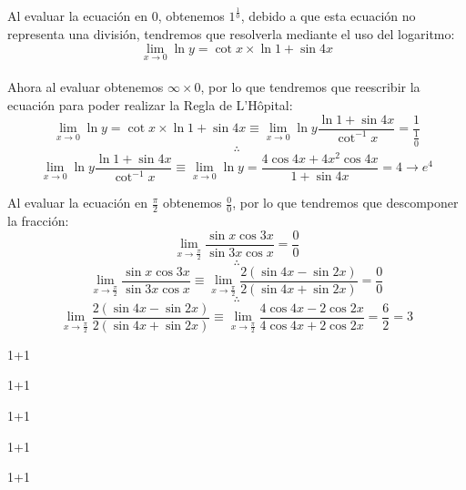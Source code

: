 \documentclass[a4paper, oneside]{report}
\begin{document}
Al evaluar la ecuación en 0, obtenemos $1^{\frac{1}{0}}$, debido a que esta ecuación no representa una división, tendremos que resolverla mediante el uso del logaritmo:\\
$$\lim_{x\to 0} \ln{y} = \cot{x}\times\ln{1+\sin{4x}}$$
\\Ahora al evaluar obtenemos $\infty \times 0$, por lo que tendremos que reescribir la ecuación para poder realizar la Regla de L'Hôpital:\\
$$\lim_{x\to 0}\ln{y} = \cot{x}\times\ln{1+\sin{4x}} \equiv \lim_{x\to 0}\ln{y}{\frac{\ln{1+\sin{4x}}}{\cot^{-1}{x}}} = \frac{1}{\frac{1}{0}}$$ $$\therefore$$ $$
\lim_{x\to 0}\ln{y}{\frac{\ln{1+\sin{4x}}}{\cot^{-1}{x}}} \equiv \lim_{x\to 0}{\ln{y}} = \frac{4\cos{4x}+4x^2\cos{4x}}{1+\sin{4x}} = 4 \rightarrow e^{4} $$

Al evaluar la ecuación en $\frac{\pi}{2}$ obtenemos $\frac{0}{0}$, por lo que tendremos que descomponer la fracción:
$$\lim_{x\to \frac{\pi}{2}} \frac{\sin{x}\cos{3x}}{\sin{3x}\cos{x}} = \frac{0}{0}$$
$$\therefore$$
$$\lim_{x\to \frac{\pi}{2}} \frac{\sin{x}\cos{3x}}{\sin{3x}\cos{x}} \equiv \lim_{x\to \frac{\pi}{2}}\frac{2(\sin{4x}-\sin{2x})}{2(\sin{4x}+\sin{2x})} = \frac{0}{0} $$
$$\therefore $$
$$\lim_{x\to \frac{\pi}{2}}\frac{2(\sin{4x}-\sin{2x})}{2(\sin{4x}+\sin{2x})} \equiv \lim_{x\to \frac{\pi}{2}}\frac{4\cos{4x}-2\cos{2x}}{4\cos{4x}+2\cos{2x}} = \frac{6}{2} = 3 $$

1+1\\

1+1\\

1+1\\

1+1\\

1+1\\


\pagebreak
\end{document}
